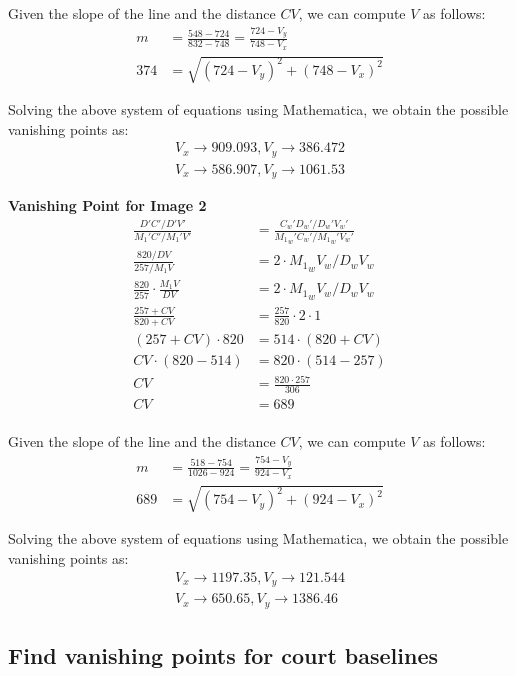 \documentclass[12pt, oneside]{article}
\begin{document}
Given the slope of the line and the distance $CV$, we can compute $V$ as follows:
\begin{align}
    m &= \frac{548-724}{832-748} = \frac{724-V_y}{748 - V_x}  \\
    374 &= \sqrt{(724-V_y)^2 + (748 - V_x)^2}
\end{align}

Solving the above system of equations using Mathematica, we obtain the possible
vanishing points as:
\begin{align*}
    {V_x\to 909.093,V_y\to 386.472} \\
    {V_x\to 586.907,V_y\to 1061.53} 
\end{align*}



\textbf{Vanishing Point for Image 2}
\begin{align*}
  \frac{D'C'/D'V'}{{M_1}'C'/{M_1}'V'} &= \frac{{C_w}'{D_w}'/{D_w}'{V_w}'}
                                        {{{M_1}_w}'{C_w}'/{{M_1}_w}'{V_w}'} \\
  \frac{820/DV}{257/M_1V}                 &= 2 \cdot {M_1}_wV_w/D_wV_w \\
  \frac{820}{257}\cdot \frac{M_1V}{DV}    &= 2 \cdot {M_1}_wV_w/D_wV_w \\
  \frac{257 + CV}{820 + CV}   &= \frac{257}{820}\cdot 2 \cdot 1 \\
  (257 + CV) \cdot 820   &= 514 \cdot (820 + CV) \\
  CV \cdot (820 - 514)   &= 820 \cdot (514 - 257)\\
  CV  &= \frac{820 \cdot 257} {306}\\
  CV  &= 689\\
\end{align*}

Given the slope of the line and the distance $CV$, we can compute $V$ as follows:
\begin{align}
    m &= \frac{518-754}{1026-924} = \frac{754-V_y}{924 - V_x}  \\
    689 &= \sqrt{(754-V_y)^2 + (924 - V_x)^2}
\end{align}

Solving the above system of equations using Mathematica, we obtain the possible
vanishing points as:
\begin{align*}
    {V_x\to 1197.35,V_y\to 121.544} \\
    {V_x\to 650.65,V_y\to 1386.46} 
\end{align*}

\subsection{Find vanishing points for court baselines}
\end{document}

